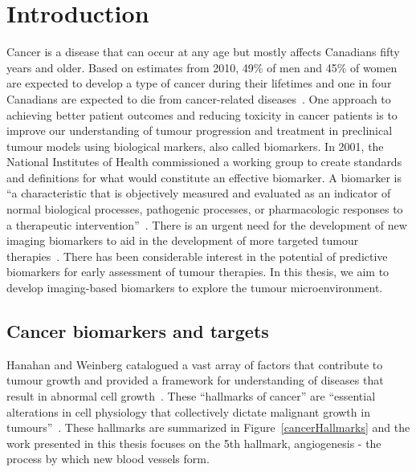 
\chapter{Introduction}
\label{ch:Introduction}

Cancer is a disease that can occur at any age but mostly affects Canadians fifty years and older.
Based on estimates from 2010, 49\% of men and 45\% of women are expected to develop a type of cancer during their lifetimes and one in four Canadians are expected to die from cancer-related diseases~\cite{CancerSociety:2018tv}.
One approach to achieving better patient outcomes and reducing toxicity in cancer patients is to improve our understanding of tumour progression and treatment in preclinical tumour models using biological markers, also called biomarkers.
In 2001, the National Institutes of Health commissioned a working group to create standards and definitions for what would constitute an effective biomarker. 
A biomarker is ``a characteristic that is objectively measured and evaluated as an indicator of normal biological processes, pathogenic processes, or pharmacologic responses to a therapeutic intervention''~\cite{BiomarkersDefinitionsWorkingGroup:2001gd}.  
There is an urgent need for the development of new imaging biomarkers to aid in the development of more targeted tumour therapies~\cite{vanderMeel:2010cb}.
There has been considerable interest in the potential of predictive biomarkers for early assessment of tumour therapies. 
In this thesis, we aim to develop imaging-based biomarkers to explore the tumour microenvironment.

\section{Cancer biomarkers and targets} 

Hanahan and Weinberg catalogued a vast array of factors that contribute to tumour growth and provided a framework for understanding of diseases that result in abnormal cell growth~\cite{Hanahan:2000wo,Hanahan:2011gu}.
These ``hallmarks of cancer'' are ``essential alterations in cell physiology that collectively dictate malignant growth in tumours''~\cite{Hanahan:2000wo}.
These hallmarks are summarized in Figure~\ref{cancerHallmarks} and the  work presented in this thesis focuses on the 5th hallmark, angiogenesis - the process by which new blood vessels form.

